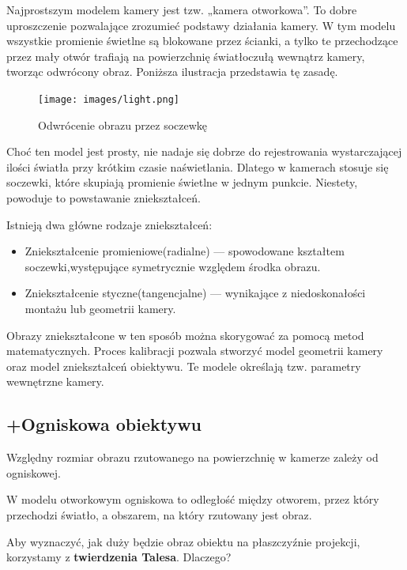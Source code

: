 \documentclass[magisterska]{pracadypl}
\begin{document}
Najprostszym modelem kamery jest tzw. „kamera otworkowa”. To dobre uproszczenie pozwalające zrozumieć podstawy działania kamery. W tym modelu wszystkie promienie świetlne są blokowane przez ścianki, a tylko te przechodzące przez mały otwór trafiają na powierzchnię światłoczułą wewnątrz kamery, tworząc odwrócony obraz. Poniższa ilustracja przedstawia tę zasadę.

\begin{figure}[H]
    \centering
    \texttt{[image: images/light.png]}
    \captionsetup{font=footnotesize}
    \caption[Odwrócenie obrazu przez soczewkę. https://funsizephysics.com/use-light-turn-world-upside/]{Odwrócenie obrazu przez soczewkę}
    \label{fig:rpi}
\end{figure}

Choć ten model jest prosty, nie nadaje się dobrze do rejestrowania wystarczającej ilości światła przy krótkim czasie naświetlania. Dlatego w kamerach stosuje się soczewki, które skupiają promienie świetlne w jednym punkcie. Niestety, powoduje to powstawanie zniekształceń.

Istnieją dwa główne rodzaje zniekształceń:

\begin{itemize}
  \item Zniekształcenie promieniowe(radialne) — spowodowane kształtem soczewki,występujące symetrycznie względem środka obrazu.

  \item Zniekształcenie styczne(tangencjalne) — wynikające z niedoskonałości montażu lub geometrii kamery.
\end{itemize}

Obrazy zniekształcone w ten sposób można skorygować za pomocą metod matematycznych. Proces kalibracji pozwala stworzyć model geometrii kamery oraz model zniekształceń obiektywu. Te modele określają tzw. parametry wewnętrzne kamery.

\subsection{+Ogniskowa obiektywu}

Względny rozmiar obrazu rzutowanego na powierzchnię w kamerze zależy od ogniskowej.

W modelu otworkowym ogniskowa to odległość między otworem, przez który przechodzi światło, a obszarem, na który rzutowany jest obraz.

Aby wyznaczyć, jak duży będzie obraz obiektu na płaszczyźnie projekcji, korzystamy z \textbf{twierdzenia Talesa}.  
Dlaczego?
\end{document}
